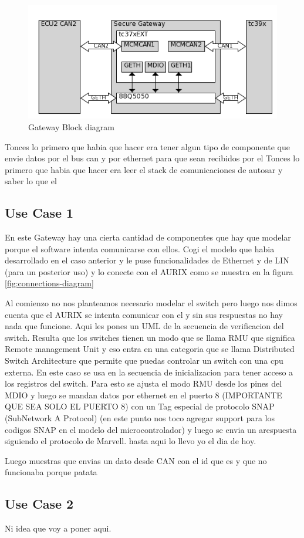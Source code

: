 \begin{figure}[!htb]
 \centering
 \includegraphics[width=\textwidth]{img/gateway_block_diagram.png}
 \caption{Gateway Block diagram}
 \label{fig:block diagram}
\end{figure}

Tonces lo primero que habia que hacer era tener algun tipo de componente que envie datos por el bus can y por ethernet para que sean recibidos por el 
Tonces lo primero que habia que hacer era leer el stack de comunicaciones de autosar y saber lo que el 
\subsection{Use Case 1}
En este Gateway hay una cierta cantidad de componentes que hay que modelar porque el software intenta comunicarse con ellos. Cogi el modelo que habia desarrollado en el caso anterior y le puse funcionalidades de Ethernet y de LIN (para un posterior uso) y lo conecte con el AURIX como se muestra en la figura \ref{fig:connections-diagram}


Al comienzo no nos planteamos necesario modelar el switch pero luego nos dimos cuenta que el AURIX se intenta comunicar con el y sin sus respuestas no hay nada que funcione. Aqui les pones un UML de la secuencia de verificacion del switch. Resulta que los switches tienen un modo que se llama RMU que significa Remote management Unit y eso entra en una categoria que se llama Distributed Switch Architecture que permite que puedas controlar un switch con una cpu externa. En este caso se usa en la secuencia de inicializacion para tener acceso a los registros del switch. Para esto se ajusta el modo RMU desde los pines del MDIO y luego se mandan datos por ethernet en el puerto 8 (IMPORTANTE QUE SEA SOLO EL PUERTO 8) con un Tag especial de protocolo SNAP (SubNetwork A Protocol) (en este punto nos toco agregar support para los codigos SNAP en el modelo del microcontrolador) y luego se envia un arespuesta siguiendo el protocolo de Marvell. hasta aqui lo llevo yo el dia de hoy.

Luego muestras que envias un dato desde CAN con el id que es y que no funcionaba porque patata

\subsection{Use Case 2}

Ni idea que voy a poner aqui.
